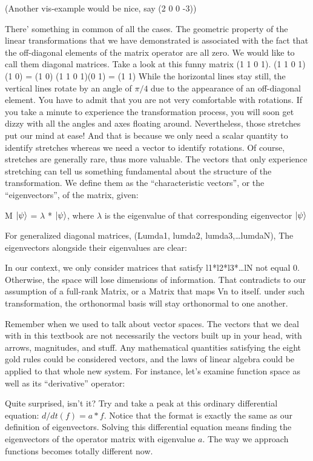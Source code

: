 \documentclass[12pt]{article}
\begin{document}
(Another vis-example would be nice, say (2 0 0 -3))

There’ something in common of all the cases. The geometric property of the linear transformations that we have demonstrated is associated with the fact that the off-diagonal elements of the matrix operator are all zero. We would like to call them diagonal matrices.
Take a look at this funny matrix (1 1 0 1).
(1 1 0 1)(1 0) = (1 0)
(1 1 0 1)(0 1) = (1 1)
While the horizontal lines stay still, the vertical lines rotate by an angle of $\pi/4$ due to the appearance of an off-diagonal element. You have to admit that you are not very comfortable with rotations. If you take a minute to experience the transformation process, you will soon get dizzy with all the angles and axes floating around. Nevertheless, those stretches put our mind at ease! 
And that is because we only need a scalar quantity to identify stretches whereas we need a vector to identify rotations. Of course, stretches are generally rare, thus more valuable. The vectors that only experience stretching can tell us something fundamental about the structure of the transformation. We define them as the “characteristic vectors”, or the “eigenvectors”, of the matrix, given:

M $\ket{\psi}$ = $\lambda$ * $\ket{\psi}$, where $\lambda$ is the eigenvalue of that corresponding eigenvector $\ket{\psi}$

For generalized diagonal matrices, 
(Lumda1, lumda2, lumda3,…lumdaN),
The eigenvectors alongside their eigenvalues are clear:

In our context, we only consider matrices that satisfy l1*l2*l3*…lN not equal 0. Otherwise, the space will lose dimensions of information. That contradicts to our assumption of a full-rank Matrix, or a Matrix that maps Vn to itself. under such transformation, the orthonormal basis will stay orthonormal to one another.

Remember when we used to talk about vector spaces. The vectors that we deal with in this textbook are not necessarily the vectors built up in your head, with arrows, magnitudes, and stuff. Any mathematical quantities satisfying the eight gold rules could be considered vectors, and the laws of linear algebra could be applied to that whole new system. For instance, let’s examine function space as well as its “derivative” operator:

Quite surprised, isn’t it? Try and take a peak at this ordinary differential equation: $d/dt (f) = a * f $. Notice that the format is exactly the same as our definition of eigenvectors. Solving this differential equation means finding the eigenvectors of the operator matrix with eigenvalue $a$. The way we approach functions becomes totally different now.
\end{document}

